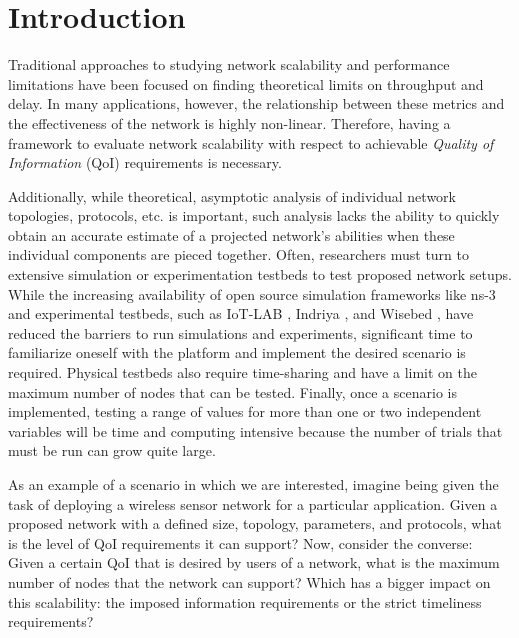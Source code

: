 \section{Introduction}
\label{sec:intro}


Traditional approaches to studying network scalability and performance limitations have been focused on finding theoretical limits on throughput and delay.  In many applications, however, the relationship between these metrics and the effectiveness of the network is highly non-linear.  Therefore, having a framework to evaluate network scalability with respect to achievable \emph{Quality of Information} (QoI) requirements is necessary.

Additionally, while theoretical, asymptotic analysis of individual network topologies, protocols, etc. is important, such analysis lacks the ability to quickly obtain an accurate estimate of a projected network's abilities when these individual components are pieced together. Often, researchers must turn to extensive simulation or experimentation testbeds to test proposed network setups. While the increasing availability of open source simulation frameworks like ns-3 \cite{ns3} and experimental testbeds, such as IoT-LAB \cite{iot_lab_exp_platform}, Indriya \cite{wsn_testbed}, and Wisebed \cite{wisebed}, have reduced the barriers to run simulations and experiments, significant time to familiarize oneself with the platform and implement the desired scenario is required. Physical testbeds also require time-sharing and have a limit on the maximum number of nodes that can be tested. Finally, once a scenario is implemented, testing a range of values for more than one or two independent variables will be time and computing intensive because the number of trials that must be run can grow quite large.

As an example of a scenario in which we are interested, imagine being given the task of deploying a wireless sensor network for a particular application. Given a proposed network with a defined size, topology, parameters, and protocols, what is the level of QoI requirements it can support?  Now, consider the converse:  Given a certain QoI that is desired by users of a network, what is the maximum number of nodes that the network can support?  Which has a bigger impact on this scalability: the imposed information requirements or the strict timeliness requirements? 

